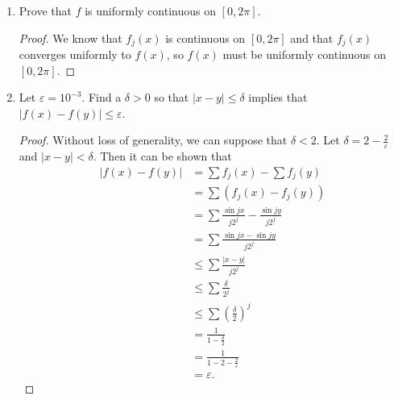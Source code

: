 \documentclass{article}
\begin{document}
\begin{enumerate}
\begin{enumerate}
\begin{proof}
                        \end{proof}
                  \item Prove that $f$ is uniformly continuous on $[0,2\pi]$.
                        \begin{proof}
                              We know that $f_j(x)$ is continuous on $[0, 2\pi]$ and that $f_j(x)$ converges
                              uniformly to $f(x)$, so $f(x)$ must be uniformly continuous on $[0, 2\pi]$.
                        \end{proof}
                  \item Let $\varepsilon=10^{-3}$. Find a $\delta>0$ so that
                        $\lvert x-y\rvert\leq \delta$ implies that
                        $\lvert f(x)-f(y)\rvert\leq \varepsilon$.
                        \begin{proof}
                              Without loss of generality, we can suppose that $\delta<2$.
                              Let $\delta=2-\frac{2}{\varepsilon}$ and $\left| x-y\right|<\delta$. Then
                              it can be shown that
                              \begin{align*}
                                    \left| f(x)-f(y)\right| & = \sum f_j(x)-\sum f_j(y)                        \\
                                                            & = \sum (f_j(x)-f_j(y))                           \\
                                                            & = \sum \frac{\sin jx}{j2^j}-\frac{\sin jy}{j2^j} \\
                                                            & = \sum \frac{\sin jx - \sin jy}{j2^j}            \\
                                                            & \leq \sum \frac{\left| x-y\right|}{j2^j}         \\
                                                            & \leq \sum \frac{\delta}{2^j}                     \\
                                                            & \leq \sum \left(\frac{\delta}{2}\right)^j        \\
                                                            & = \frac{1}{1-\frac{\delta}{2}}                   \\
                                                            & = \frac{1}{1-2-\frac{2}{\varepsilon}}            \\
                                                            & = \varepsilon.
                              \end{align*}
                        \end{proof}
            \end{enumerate}
\end{enumerate}
\end{document}
